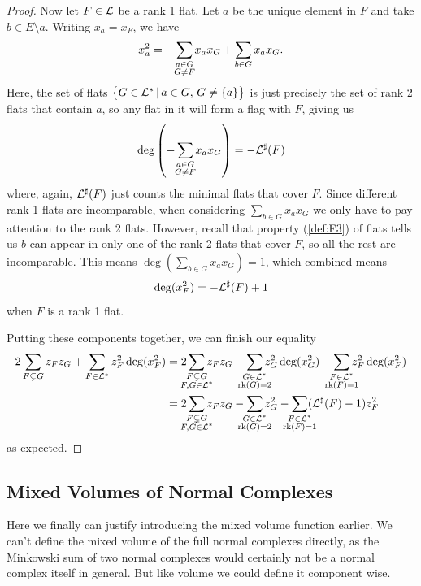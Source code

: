 \documentclass[12pt,oneside]{../../sfsuthesis}
\begin{document}
\begin{proof}
    Now let \( F \in \mathcal{L} \) be a rank 1 flat. Let \( a \) be the unique element in \( F \) and take \( b \in E \setminus a \).
    Writing \( x_a = x_F \), we have
    \[
        x_a^2 = - \sum_{\mathclap{\substack{a \in G \\ G \neq F}}}x_a x_G + \sum_{b \in G} x_a x_G.
    \]
    Here, the set of flats \( \big\{ G \in \mathcal{L}^\ast \, | \, a \in G, \, G \neq \{ a \}\big\} \) is just precisely the set of rank 2 flats that contain \( a \), so any flat in it will form a flag with \( F \), giving us
    \[
        \deg \left( - \sum_{\mathclap{\substack{a \in G \\ G \neq F}}}x_a x_G \right) = -\cL^\sharp(F)
    \]
    where, again, \( \mathcal{L}^\sharp(F) \) just counts the minimal flats that cover \( F \).
    Since different rank 1 flats are incomparable, when considering \( \sum_{b \in G} x_a x_G \) we only have to pay attention to the rank 2 flats.
    However, recall that property (\ref{def:F3}) of flats tells us \( b \) can appear in only one of the rank 2 flats that cover \( F \), so all the rest are incomparable.
    This means \( \deg(\sum_{b \in G} x_a x_G) = 1 \), which combined means
    \[
        \deg(x_F^2) = - \mathcal{L}^\sharp(F) + 1
    \]
    when \( F \) is a rank 1 flat.

    Putting these components together, we can finish our equality
    \begin{align*}
        2 \sum_{F \subsetneq G} z_F z_{G} + \sum_{F \in \cL^\ast} z_F^2 \deg(x_F^2)
         & = 2\sum_{\mathclap{\substack{F \subsetneq G \\ F,G \in \cL^\ast}}} z_F z_G - \sum_{\mathclap{\substack{G \in \cL^\ast \\ \rk(G)=2}}} z_G^2\deg(x_G^2) - \sum_{\mathclap{\substack{F \in \cL^\ast \\ \rk(F)=1}}}z_F^2 \deg(x_F^2) \\
         & = 2\sum_{\mathclap{\substack{F \subsetneq G \\ F,G \in \cL^\ast}}} z_F z_G - \sum_{\mathclap{\substack{G \in \cL^\ast \\ \rk(G)=2}}} z_G^2 - \sum_{\mathclap{\substack{F \in \cL^\ast \\ \rk(F)=1}}}(\cL^\sharp(F) - 1)z_F^2
    \end{align*}
    as expceted.
\end{proof}

\subsection{Mixed Volumes of Normal Complexes}
Here we finally can justify introducing the mixed volume function earlier.
We can't define the mixed volume of the full normal complexes directly, as the Minkowski sum of two normal complexes would certainly not be a normal complex itself in general.
But like volume we could define it component wise.
\end{document}
